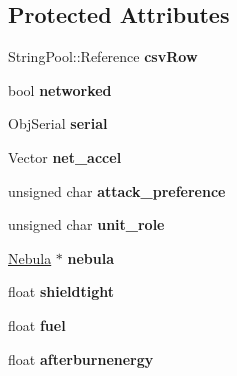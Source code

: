 \subsection*{Protected Attributes}
\begin{DoxyCompactItemize}
\item 
String\+Pool\+::\+Reference {\bfseries csv\+Row}\hypertarget{classUnit_a218bacb444a56023a5b16638f60ee276}{}\label{classUnit_a218bacb444a56023a5b16638f60ee276}

\item 
bool {\bfseries networked}\hypertarget{classUnit_a7a6c70328a9f8225f99e64174e8e9004}{}\label{classUnit_a7a6c70328a9f8225f99e64174e8e9004}

\item 
Obj\+Serial {\bfseries serial}\hypertarget{classUnit_aa27bdf08dbbd810d30b2da6b89273ab0}{}\label{classUnit_aa27bdf08dbbd810d30b2da6b89273ab0}

\item 
Vector {\bfseries net\+\_\+accel}\hypertarget{classUnit_a69c87892e640a054dbb89dbdadab6275}{}\label{classUnit_a69c87892e640a054dbb89dbdadab6275}

\item 
unsigned char {\bfseries attack\+\_\+preference}\hypertarget{classUnit_adc8decca28eb50cfecad24709d9a1cf1}{}\label{classUnit_adc8decca28eb50cfecad24709d9a1cf1}

\item 
unsigned char {\bfseries unit\+\_\+role}\hypertarget{classUnit_ab1cec5b1c17fc3cb963194a288797ba9}{}\label{classUnit_ab1cec5b1c17fc3cb963194a288797ba9}

\item 
\hyperlink{classNebula}{Nebula} $\ast$ {\bfseries nebula}\hypertarget{classUnit_af3cc739ece7b97c7a436af9e8a095f1f}{}\label{classUnit_af3cc739ece7b97c7a436af9e8a095f1f}

\item 
float {\bfseries shieldtight}\hypertarget{classUnit_acd47ce32eb7286d283f2231f8630888d}{}\label{classUnit_acd47ce32eb7286d283f2231f8630888d}

\item 
float {\bfseries fuel}\hypertarget{classUnit_ae7c82da7d0047b27244d243b99a222e8}{}\label{classUnit_ae7c82da7d0047b27244d243b99a222e8}

\item 
float {\bfseries afterburnenergy}\hypertarget{classUnit_adefcfe4bde909e13fbb13226ce2d7993}{}\label{classUnit_adefcfe4bde909e13fbb13226ce2d7993}


\end{DoxyCompactItemize}
